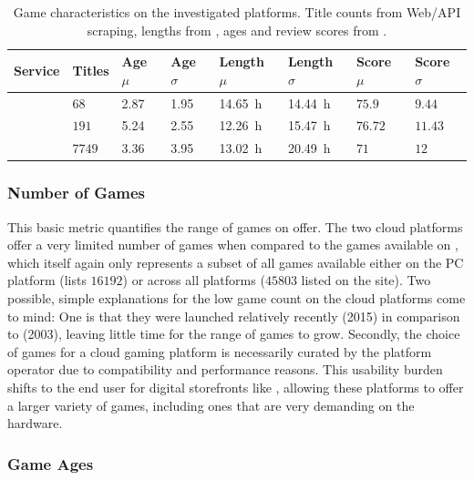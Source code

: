 
\begin{table}
\centering
\caption{Game characteristics on the investigated platforms. Title counts from Web/API scraping, lengths from \hltb, ages and review scores from \metacritic.}
\label{tab:game-stats}
	\begin{tabu}{X[2]|X[r]X[r]X[r]X[r]X[r]X[r]X[r]}
	\toprule
	Service & Titles & Age $\mu$ & Age $\sigma$ & Length $\mu$ & Length $\sigma$ & Score $\mu$ & Score $\sigma$ \\
	\midrule
	\gfnow & $68$ & \SI{2.87}{\year} & \SI{1.95}{\year} & \SI{14.65}{\hour} & \SI{14.44}{\hour} & $75.9$ & $9.44$ \\
	\psnow & $191$ & \SI{5.24}{\year} & \SI{2.55}{\year} & \SI{12.26}{\hour} & \SI{15.47}{\hour} & $76.72$ & $11.43$ \\
	\steam & $7749$ & \SI{3.36}{\year} & \SI{3.95}{\year} & \SI{13.02}{\hour} & \SI{20.49}{\hour} & $71$ & $12$ \\
	\bottomrule
	\end{tabu}
\end{table}


\subsubsection{Number of Games}

This basic metric quantifies the range of games on offer. The two cloud platforms offer a very limited number of games when compared to the games available on \steam, which itself again only represents a subset of all games available either on the PC platform (\metacritic lists $16192$) or across all platforms ($45803$ listed on the site). Two possible, simple explanations for the low game count on the cloud platforms come to mind: One is that they were launched relatively recently (2015) in comparison to \steam (2003), leaving little time for the range of games to grow. Secondly, the choice of games for a cloud gaming platform is necessarily curated by the platform operator due to compatibility and performance reasons. This usability burden shifts to the end user for digital storefronts like \steam, allowing these platforms to offer a larger variety of games, including ones that are very demanding on the hardware.


\subsubsection{Game Ages}

